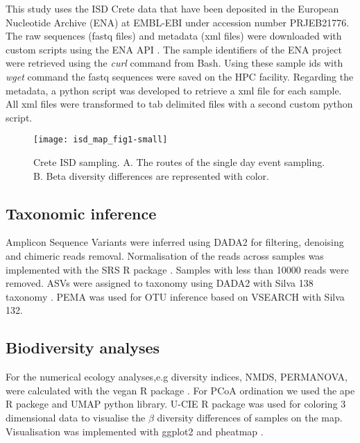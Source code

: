 This study uses the ISD Crete data that have been deposited
in the European Nucleotide Archive (ENA) at EMBL-EBI under accession number PRJEB21776.
The raw sequences (fastq files) and metadata (xml files) were downloaded with custom scripts using the ENA API \parencite{Yuan2023}.
The sample identifiers of the ENA project were retrieved using the \textit{curl} command from Bash. Using these 
sample ids with \textit{wget} command the fastq sequences were saved on the HPC facility. Regarding the metadata, 
a python script was developed to retrieve a xml file for each sample. All xml files
were transformed to tab delimited files with a second custom python script.

\begin{figure}[h] 
    \centering\texttt{[image: isd\_map\_fig1-small]}
    \caption{Crete ISD sampling. A. The routes of the single day event sampling. B. Beta diversity differences are represented with color.}
    \label{fig:isd_crete_sampling}
\end{figure}

\subsection{Taxonomic inference}\label{tax_inference}
Amplicon Sequence Variants were inferred using DADA2 \parencite{Callahan2016} for 
filtering, denoising and chimeric reads removal. Normalisation of the reads
across samples was implemented with the SRS R package \parencite{Beule2020}. Samples
with less than 10000 reads were removed. ASVs were assigned to taxonomy using 
DADA2 with Silva 138 taxonomy \parencite{quast_silva_2013}.
PEMA was used for OTU inference based on VSEARCH \parencite{zafeiropoulos2020pema} with Silva 132.

\subsection{Biodiversity analyses}\label{biodiversity}

For the numerical ecology analyses,e.g diversity indices, NMDS, PERMANOVA, were calculated
with the vegan R package \parencite{oksanen2024vegan}.
For PCoA ordination we used the ape R packege \parencite{Paradis2004} and UMAP python library\parencite{mcinnes2018umap-software}.
U-CIE R package was used for coloring 3 dimensional data \parencite{Koutrouli2022} to 
visualise the $\beta$ diversity differences of samples on the map.
Visualisation was implemented with ggplot2 \parencite{wickham_ggplot2_2016} and pheatmap \parencite{Kolde2019}.

